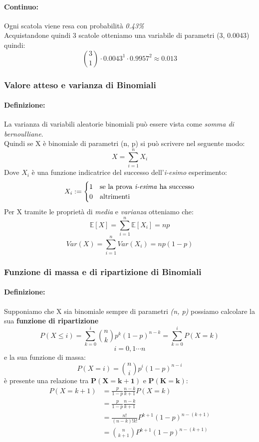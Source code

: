 \documentclass[]{article}
\newcommand{\ev}{\mathbb{E}[X]}
\renewcommand{\ev}[1]{\mathbb{E}[#1]}
\newcommand{\definizione}{\paragraph{Definizione:}}
\begin{document}
    \paragraph{Continuo:} Ogni scatola viene resa con probabilità \textit{0.43\%} \\
    Acquistandone quindi 3 scatole otteniamo una variabile di parametri (3, 0.0043) quindi:
    \[ \binom{3}{1} \cdot 0.0043^1 \cdot 0.9957^2 \approx 0.013 \]

    \subsubsection{Valore atteso e varianza di Binomiali}
    \definizione La varianza di variabili aleatorie binomiali può essere vista come \textit{somma di bernoulliane}. \\
    Quindi se X è binomiale di parametri (n, p) si può scrivere nel seguente modo:
    \[ X = \sum_{i = 1}^{n} X_i \]
    Dove $X_i$ è una funzione indicatrice del successo dell'\textit{i-esimo} esperimento:
    \begin{equation*}
        X_i :=
        \begin{cases}
            1 & \text{se la prova \textit{i-esima} ha successo} \\
            0 & \text{altrimenti}
        \end{cases}
    \end{equation*}
    Per X tramite le proprietà di \textit{media} e \textit{varianza} otteniamo che:
    \[ \ev{X} = \sum_{i = 1}^{n} \ev{X_i} = np \]
    \[ Var(X) = \sum_{i = 1}^{n} Var(X_i) = np(1 - p) \]


    \subsubsection{Funzione di massa e di ripartizione di Binomiali}
    \definizione Supponiamo che  X sia binomiale sempre di parametri \textit{(n, p)} possiamo calcolare la sua \textbf{funzione di ripartizione}
    \[ P(X \leq i) = \sum_{k = 0}^{i} \binom{n}{k} p^k (1-p)^{n-k} = \sum_{k = 0}^{i} P(X = k) \]
    \[ i = 0,1 \cdots n \]
    e la sua funzione di massa:
    \[ P(X = i) = \binom{n}{i} p^i (1-p)^{n-i} \]
    è presente una relazione tra $\boldsymbol{P(X = k + 1)}$ e $\boldsymbol{P(K = k)}$:
    \begin{equation*}
        \begin{split}
            P(X = k + 1) &= \frac{p}{1 - p} \frac{n - k}{k + 1} P(X = k) \\
            & = \frac{p}{1 - p} \frac{n - k}{k + 1} \\ 
            & = \frac{n!}{(n-k)! k!} P^{k+1} (1-p)^{n-(k+1)} \\
            & = \binom{n}{k + 1} P^{k+1} (1-p)^{n-(k+1)}
        \end{split}
    \end{equation*}
\end{document}
